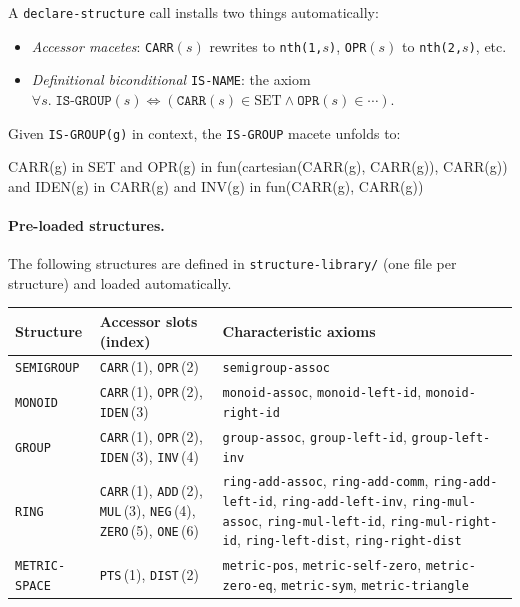 A \texttt{declare-structure} call installs two things automatically:
\begin{itemize}
\item \emph{Accessor macetes}: \texttt{CARR}$(s)$ rewrites to
  \texttt{nth(1,$s$)}, \texttt{OPR}$(s)$ to \texttt{nth(2,$s$)}, etc.
\item \emph{Definitional biconditional} \texttt{IS-NAME}: the axiom
  $\forall s.\;\texttt{IS-GROUP}(s) \Leftrightarrow
   (\texttt{CARR}(s)\in\mathrm{SET} \wedge \texttt{OPR}(s)\in\cdots)$.
\end{itemize}

Given \texttt{IS-GROUP(g)} in context, the \texttt{IS-GROUP} macete
unfolds to:
\begin{VNBsnip}
CARR(g) in SET
and OPR(g) in fun(cartesian(CARR(g), CARR(g)), CARR(g))
and IDEN(g) in CARR(g)
and INV(g) in fun(CARR(g), CARR(g))
\end{VNBsnip}

\paragraph{Pre-loaded structures.}
The following structures are defined in \texttt{structure-library/} (one
file per structure) and loaded automatically.

\begin{center}\scriptsize
\begin{tabular}{@{}p{2.3cm}p{4.3cm}p{5.3cm}@{}}
\toprule
\textbf{Structure} & \textbf{Accessor slots (index)} & \textbf{Characteristic axioms} \\
\midrule
\texttt{SEMIGROUP} &
  \texttt{CARR}\,(1), \texttt{OPR}\,(2) &
  \texttt{semigroup-assoc} \\[4pt]
\texttt{MONOID} &
  \texttt{CARR}\,(1), \texttt{OPR}\,(2), \texttt{IDEN}\,(3) &
  \texttt{monoid-assoc},
  \texttt{monoid-left-id},
  \texttt{monoid-right-id} \\[4pt]
\texttt{GROUP} &
  \texttt{CARR}\,(1), \texttt{OPR}\,(2), \texttt{IDEN}\,(3), \texttt{INV}\,(4) &
  \texttt{group-assoc},
  \texttt{group-left-id},
  \texttt{group-left-inv} \\[4pt]
\texttt{RING} &
  \texttt{CARR}\,(1), \texttt{ADD}\,(2), \texttt{MUL}\,(3),
  \texttt{NEG}\,(4), \texttt{ZERO}\,(5), \texttt{ONE}\,(6) &
  \texttt{ring-add-assoc}, \texttt{ring-add-comm},
  \texttt{ring-add-left-id}, \texttt{ring-add-left-inv},
  \texttt{ring-mul-assoc}, \texttt{ring-mul-left-id},
  \texttt{ring-mul-right-id},
  \texttt{ring-left-dist}, \texttt{ring-right-dist} \\[4pt]
\texttt{METRIC-SPACE} &
  \texttt{PTS}\,(1), \texttt{DIST}\,(2) &
  \texttt{metric-pos},
  \texttt{metric-self-zero},
  \texttt{metric-zero-eq},
  \texttt{metric-sym},
  \texttt{metric-triangle} \\
\bottomrule
\end{tabular}
\end{center}

